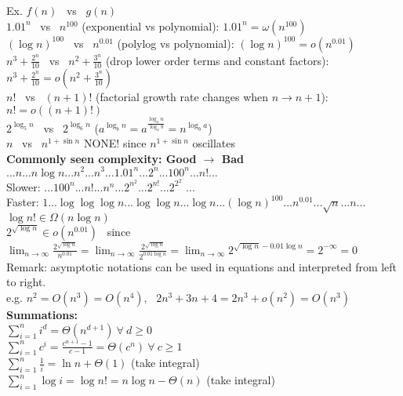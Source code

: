 \documentclass[20pt,letterpaper]{article}
\begin{document}
Ex. $f(n)$ \ vs \ $g(n)$ \\
$1.01^n$ \ vs \ $n^{100}$ (exponential vs polynomial): $1.01^n = \omega(n^{100})$ \\
$(\log n)^{100}$ \ vs \ $n^{0.01}$ (polylog vs polynomial): $(\log n)^{100} = o(n^{0.01})$ \\
$n^3+\frac{2^n}{10}$ \ vs \ $n^2+\frac{3^n}{10}$ (drop lower order terms and constant factors): $n^3+\frac{2^n}{10} = o(n^2+\frac{3^n}{10})$ \\
$n!$ \ vs \ $(n+1)!$ (factorial growth rate changes when $n \rightarrow n+1$): $n! = o((n+1)!)$ \\
$2^{\log_{5}{n}}$ \ vs \ $2^{\log_{6}{n}}$ ($a^{\log_{b}{n}} = a^{\frac{\log_{a}{n}}{\log_{a}{b}}} = n^{\log_{b}{a}}$) \\
$n$ \ vs \ $n^{1+\sin n}$ NONE! since $n^{1+\sin n}$ oscillates \\

{\bf Commonly seen complexity: Good $\rightarrow$ Bad} \\
$...n...n\log n...n^2...n^3...1.01^n...2^n...100^n...n!...$ \\
Slower: $...100^n...n!...n^n...2^{n^2}...2^{n!}...2^{2^{2^{...}}}...$ \\
Faster: $1...\log\log\log n...\log\log n...\log n...(\log n)^{100}...n^{0.01}...\sqrt n...n...$ \\


$\log n! \in \Omega(n\log n)$ \\
$2^{\sqrt{\log n}} \in o(n^{0.01})$ \ since $\lim_{n \to \infty} \frac{2^{\sqrt{\log n}}}{n^{0.01}} = \lim_{n \to \infty} \frac{2^{\sqrt{\log n}}}{2^{0.01\log n}} = \lim_{n \to \infty} 2^{\sqrt{\log n} - 0.01\log n} = 2^{-\infty} = 0$ \\

Remark: asymptotic notations can be used in equations and interpreted from left to right. \\
e.g. $n^2 = O(n^3) = O(n^4)$, \ $2n^3+3n+4 = 2n^3+ o(n^2) = O(n^3)$ \\

{\bf Summations:} \\
$\sum\limits_{i=1}^n i^d = \Theta(n^{d+1}) \ \forall\ d \geq 0$ \\
$\sum\limits_{i=1}^n c^i = \frac{c^{n+1}-1}{c-1} = \Theta(c^n) \ \forall\ c \geq 1$ \\
$\sum\limits_{i=1}^n \frac{1}{i} = \ln n + \Theta(1)$ (take integral)\\
$\sum\limits_{i=1}^n \log i = \log n! = n\log n - \Theta(n)$ (take integral) \\
\end{document}
